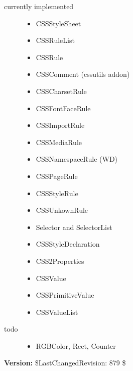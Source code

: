 \begin{description}
\item[{currently implemented}] \leavevmode \begin{itemize}
\item {} 
CSSStyleSheet

\item {} 
CSSRuleList

\item {} 
CSSRule

\item {} 
CSSComment (cssutils addon)

\item {} 
CSSCharsetRule

\item {} 
CSSFontFaceRule

\item {} 
CSSImportRule

\item {} 
CSSMediaRule

\item {} 
CSSNamespaceRule (WD)

\item {} 
CSSPageRule

\item {} 
CSSStyleRule

\item {} 
CSSUnkownRule

\item {} 
Selector and SelectorList

\item {} 
CSSStyleDeclaration

\item {} 
CSS2Properties

\item {} 
CSSValue

\item {} 
CSSPrimitiveValue

\item {} 
CSSValueList

\end{itemize}

\item[{todo}] \leavevmode \begin{itemize}
\item {} 
RGBColor, Rect, Counter

\end{itemize}

\end{description}
\textbf{Version:} \$LastChangedRevision: 879 \$



